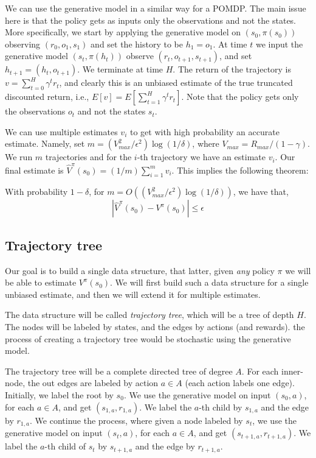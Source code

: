 We can use the generative model in a similar way for a POMDP. The
main issue here is that the policy gets as inputs only the
observations and not the states. More specifically, we start by
applying the generative model on $(s_0, \pi(s_0))$  observing
$(r_0,o_1,s_1)$ and set the history to be $h_1=o_1$. At time $t$ we
input the generative model $(s_t,\pi(h_t))$  observe
$(r_t,o_{t+1},s_{t+1})$, and set $h_{t+1}=(h_t,o_{t+1})$. We
terminate at time $H$. The return of the trajectory is
$v=\sum_{t=0}^H \gamma^t r_t$, and clearly this is an unbiased
estimate of the true truncated discounted return, i.e.,
$E[v]=E[\sum_{t=1}^H \gamma^t r_t]$. Note that the policy gets only
the observations $o_t$ and not the states $s_t$.

We can use multiple estimates $v_i$ to get with high probability an
accurate estimate. Namely, set $m=(V_{max}^2/\epsilon^2)\log
(1/\delta)$, where $V_{max}=R_{max}/(1-\gamma)$. We run $m$
trajectories and for the $i$-th trajectory we have an estimate
$v_i$. Our final estimate is $\hat{V}^\pi(s_0) =(1/m)\sum_{i=1}^m
v_i$. This implies the following theorem:

\begin{theorem}
With probability $1-\delta$, for $m=O((V_{max}^2/\epsilon^2)\log
(1/\delta))$, we have that,
\[
|\hat{V}^\pi(s_0) -V^\pi(s_0)|\leq \epsilon
\]
\end{theorem}

\subsection{Trajectory tree}

Our goal is to build a single data structure, that latter, given
{\em any} policy $\pi$ we will be able to estimate $V^\pi(s_0)$. We
will first build such a data structure for a single unbiased
estimate, and then we will extend it for multiple estimates.

The data structure will be called {\em trajectory tree}, which will
be a tree of depth $H$. The nodes will be labeled by states, and the
edges by actions (and rewards). the process of creating a trajectory
tree would be stochastic using the generative model.

The trajectory tree will be a complete directed tree of degree $A$.
For each inner-node, the out edges are labeled by action $a\in A$
(each action labels one edge).
%
Initially, we label the root by $s_0$. We use the generative model
on input $(s_0,a)$, for each $a\in A$, and get $(s_{1,a},r_{1,a})$.
We label the $a$-th child by $s_{1,a}$ and the edge by $r_{1,a}$. We
continue the process, where given a node labeled by $s_t$, we use
the generative model on input $(s_t,a)$, for each $a\in A$, and get
$(s_{t+1,a},r_{t+1,a})$. We label the $a$-th child of $s_t$ by
$s_{t+1,a}$ and the edge by $r_{t+1,a}$.

